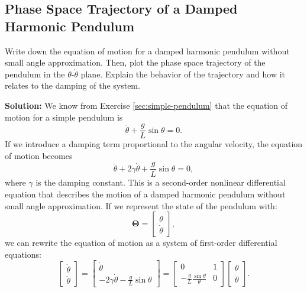 \documentclass[12pt]{article}
\begin{document}
\subsection{Phase Space Trajectory of a Damped Harmonic Pendulum}
Write down the equation of motion for a damped harmonic pendulum without small angle approximation. Then, plot the phase space trajectory of the pendulum in the $\theta$-$\dot{\theta}$ plane. Explain the behavior of the trajectory and how it relates to the damping of the system.

\textbf{Solution:}
We know from Exercise \ref{sec:simple-pendulum} that the equation of motion for a simple pendulum is
\begin{equation}
    \ddot{\theta}+\frac{g}{L}\sin\theta=0.
\end{equation}
If we introduce a damping term proportional to the angular velocity, the equation of motion becomes
\begin{equation}
    \ddot{\theta}+2\gamma\dot{\theta}+\frac{g}{L}\sin\theta=0,
\end{equation}
where $\gamma$ is the damping constant. This is a second-order nonlinear differential equation that describes the motion of a damped harmonic pendulum without small angle approximation. If we represent the state of the pendulum with:
\begin{equation}
    \mathbf{\Theta}=\begin{bmatrix}\theta\\\dot{\theta}\end{bmatrix},
\end{equation}
we can rewrite the equation of motion as a system of first-order differential equations:
\begin{equation}
    \begin{bmatrix}\dot{\theta}\\\ddot{\theta}\end{bmatrix}=\begin{bmatrix}\dot{\theta}\\-2\gamma\dot{\theta}-\frac{g}{L}\sin\theta\end{bmatrix} = \begin{bmatrix}0 & 1 \\ -\frac{g}{L}\frac{\sin\theta}{\theta} & 0 \end{bmatrix} \begin{bmatrix}\theta\\\dot{\theta}\end{bmatrix}.
\end{equation}
\end{document}
